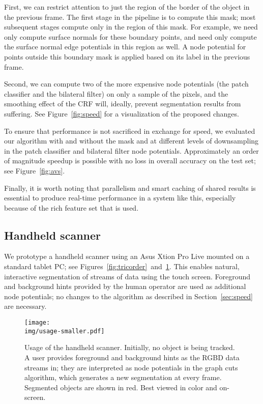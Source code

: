 \documentclass[conference]{IEEEtran}
\newcommand{\img}{img}
\begin{document}
First, we can restrict attention to just the region of the border of the object in the previous frame.  The first stage in the pipeline is to compute this mask; most subsequent stages compute only in the region of this mask.  For example, we need only compute surface normals for these boundary points, and need only compute the surface normal edge potentials in this region as well.  A node potential for points outside this boundary mask is applied based on its label in the previous frame.

Second, we can compute two of the more expensive node potentials (the patch classifier and the bilateral filter) on only a sample of the pixels, and the smoothing effect of the CRF will, ideally, prevent segmentation results from suffering.  See Figure~\ref{fig:speed} for a visualization of the proposed changes.

To ensure that performance is not sacrificed in exchange for speed, we evaluated our algorithm with and without the mask and at different levels of downsampling in the patch classifier and bilateral filter node potentials.  Approximately an order of magnitude speedup is possible with no loss in overall accuracy on the test set; see Figure~\ref{fig:avs}.

Finally, it is worth noting that parallelism and smart caching of shared results is essential to produce real-time performance in a system like this, especially because of the rich feature set that is used.



\subsection{Handheld scanner}

We prototype a handheld scanner using an Asus Xtion Pro Live mounted on a standard tablet PC; see Figures~\ref{fig:tricorder}~and~\ref{fig:usage}.  This enables natural, interactive segmentation of streams of data using the touch screen.  Foreground and background hints provided by the human operator are used as additional node potentials; no changes to the algorithm as described in Section~\ref{sec:speed} are necessary.

\begin{figure}
  \centering
  \texttt{[image: \\img/usage-smaller.pdf]}
  \caption{Usage of the handheld scanner.  Initially, no object is being tracked.  A user provides foreground and background hints as the RGBD data streams in; they are interpreted as node potentials in the graph cuts algorithm, which generates a new segmentation at every frame.  Segmented objects are shown in red.  Best viewed in color and on-screen.}
  \label{fig:usage}
\end{figure}
\end{document}

